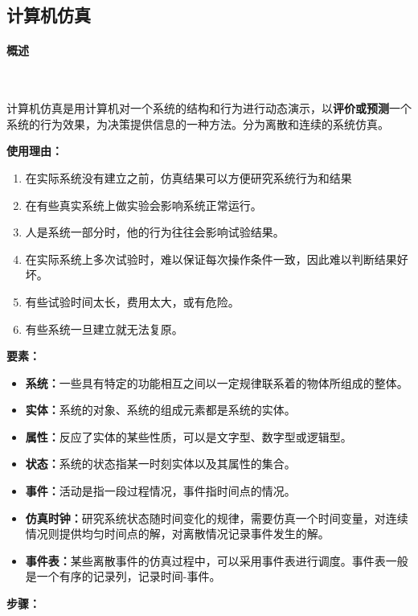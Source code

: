 \subsection{计算机仿真}

\paragraph{概述}~{}

计算机仿真是用计算机对一个系统的结构和行为进行动态演示，以\textbf{评价或预测}一个系统的行为效果，为决策提供信息的一种方法。分为离散和连续的系统仿真。

\textbf{使用理由：}

\begin{enumerate}
    \item 在实际系统没有建立之前，仿真结果可以方便研究系统行为和结果
    \item 在有些真实系统上做实验会影响系统正常运行。
    \item 人是系统一部分时，他的行为往往会影响试验结果。
    \item 在实际系统上多次试验时，难以保证每次操作条件一致，因此难以判断结果好坏。
    \item 有些试验时间太长，费用太大，或有危险。
    \item 有些系统一旦建立就无法复原。
\end{enumerate}

\textbf{要素：}

\begin{itemize}
    \item \textbf{系统：}一些具有特定的功能相互之间以一定规律联系着的物体所组成的整体。
    \item \textbf{实体：}系统的对象、系统的组成元素都是系统的实体。
    \item \textbf{属性：}反应了实体的某些性质，可以是文字型、数字型或逻辑型。
    \item \textbf{状态：}系统的状态指某一时刻实体以及其属性的集合。
    \item \textbf{事件：}活动是指一段过程情况，事件指时间点的情况。
    \item \textbf{仿真时钟：}研究系统状态随时间变化的规律，需要仿真一个时间变量，对连续情况则提供均匀时间点的解，对离散情况记录事件发生的解。
    \item \textbf{事件表：}某些离散事件的仿真过程中，可以采用事件表进行调度。事件表一般是一个有序的记录列，记录时间-事件。
\end{itemize}

\textbf{步骤：}

